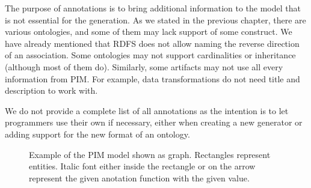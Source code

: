 The purpose of annotations is to bring additional information to the model that is not essential for the generation. As we stated in the previous chapter, there are various ontologies, and some of them may lack support of some construct. We have already mentioned that RDFS does not allow naming the reverse direction of an association. Some ontologies may not support cardinalities or inheritance (although most of them do). Similarly, some artifacts may not use all every information from PIM. For example, data transformations do not need title and description to work with.

We do not provide a complete list of all annotations as the intention is to let programmers use their own if necessary, either when creating a new generator or adding support for the new format of an ontology.

\begin{figure}[h!]\centering
\centering
{}

  \caption{Example of the PIM model shown as graph. Rectangles represent entities. Italic font either inside the rectangle or on the arrow represent the given anotation function with the given value. }
\end{figure}

